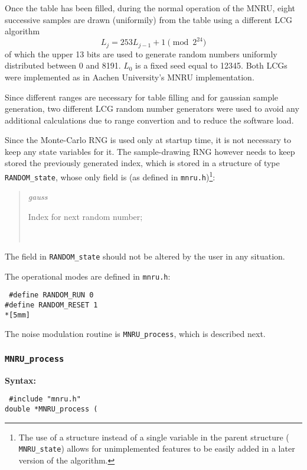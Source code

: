 Once the table has been filled, during the normal operation of the MNRU, eight successive samples are drawn (uniformily)
from the table using a different LCG algorithm
\[
            L_{j} = 253 L_{j-1} + 1 \pmod{2^{24}}
\]
of which the upper 13 bits are used to generate random numbers uniformly distributed between 0 and 8191. $L_0$ is a
fixed seed equal to 12345.
Both LCGs were implemented as in Aachen University's MNRU implementation.

Since different ranges are necessary for table filling and for gaussian sample generation, two different LCG random
number generators were used to avoid any additional calculations due to range convertion and to reduce the software load.

Since the Monte-Carlo RNG is used only at startup time, it is not necessary to keep any state variables for it.
The sample-drawing RNG however needs to keep stored the previously generated index, which is stored in a structure of
type {\tt RANDOM\_state}, whose only field is (as defined in {\tt mnru.h})\footnote{\SF The use of a structure
instead of a single variable in the parent structure ({\tt
MNRU\_state}) allows for unimplemented features to be easily added in
a later version of the algorithm.}:
\begin{quote} \normalsize
 {\em gauss}    \hfill \parbox{100mm}{\SF Index for next random number;}\\
\end{quote}

The field in {\tt RANDOM\_state} should not be altered by the user in any situation.

The operational modes are defined in {\tt mnru.h}:

 \parbox[t]{120mm}{\tt
\#define RANDOM\_RUN 0\\
\#define RANDOM\_RESET 1\\*[5mm]
}

The noise modulation routine is {\tt MNRU\_process}, which is described next.

\subsubsection{{\tt MNRU\_process}}

{\bf Syntax: }

{\tt
\#include "mnru.h"\\
double *MNRU\_process (
}

